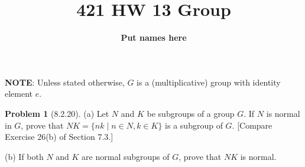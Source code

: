 \documentclass[12pt]{article}
\theoremstyle{definition}
\newtheorem*{prob}{Problem}
\begin{document}
%
\title{421 HW 13 Group}
\author{\textbf{Put names here}}

\date{}

\maketitle

\textbf{NOTE}: Unless stated otherwise, $G$ is a (multiplicative) 
group with identity element $e$.



\begin{prob}[8.2.20] \text{ }

(a)   Let $N$ and $K$ be subgroups of a group $G$. 
If $N$ is normal in $G$, prove that $NK = \{nk \mid n\in N, k\in K\}$ 
is a subgroup of $G$. [Compare Exercise 26(b) of Section 7.3.]     

(b) If  both $N$ and $K$ are normal subgroups of  $G$, prove that $NK$ is normal.
\end{prob}
\end{document}
